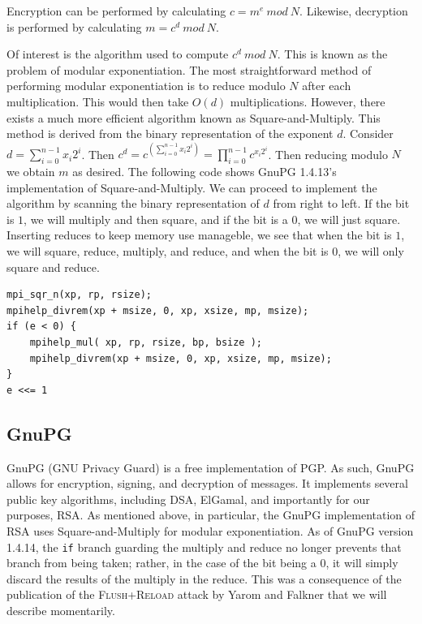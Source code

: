 \documentclass[11pt]{llncs}
\newcommand{\flushreload}{\textsc{Flush}+\textsc{Reload}}
\begin{document}
Encryption can be performed by calculating $c = m^e\ mod\ N$. Likewise,
decryption is performed by calculating $m = c^d\ mod\ N$.

Of interest is the algorithm used to compute $c^d\ mod\ N$. This is known as the
problem of modular exponentiation. The most straightforward method of performing
modular exponentiation is to reduce modulo $N$ after each multiplication. This
would then take $O(d)$ multiplications. However, there exists a much more
efficient algorithm known as Square-and-Multiply\cite{Knuth:1997:ACP:270146}.
This method is derived from the binary representation of the exponent $d$.
Consider $d = \sum_{i=0}^{n-1}x_i 2^i$. Then $c^d = c^{(\sum_{i=0}^{n-1}x_i
2^i)} = \prod_{i=0}^{n-1}c^{x_i 2^i}$. Then reducing modulo $N$ we obtain $m$ as
desired. The following code shows GnuPG 1.4.13's implementation of
Square-and-Multiply. We can proceed to implement the algorithm by scanning the
binary representation of $d$ from right to left. If the bit is $1$, we will
multiply and then square, and if the bit is a $0$, we will just square.
Inserting reduces to keep memory use manageble, we see that when the bit is $1$,
we will square, reduce, multiply, and reduce, and when the bit is $0$, we will
only square and reduce.

\begin{lstlisting}[caption={GnuPG 1.4.13's implementation of Square-and-Multiply
    (excerpted)}]
mpi_sqr_n(xp, rp, rsize);
mpihelp_divrem(xp + msize, 0, xp, xsize, mp, msize);
if (e < 0) {
    mpihelp_mul( xp, rp, rsize, bp, bsize );
    mpihelp_divrem(xp + msize, 0, xp, xsize, mp, msize);
}
e <<= 1
\end{lstlisting}

\subsection{GnuPG}

GnuPG (GNU Privacy Guard) is a free implementation of PGP. As such, GnuPG allows
for encryption, signing, and decryption of messages. It implements several
public key algorithms, including DSA, ElGamal, and importantly for our purposes,
RSA. As mentioned above, in particular, the GnuPG implementation of RSA uses
Square-and-Multiply for modular exponentiation. As of GnuPG version 1.4.14, the
\texttt{if} branch guarding the multiply and reduce no longer prevents that
branch from being taken; rather, in the case of the bit being a $0$, it will
simply discard the results of the multiply in the reduce. This was a consequence
of the publication of the \flushreload{} attack by Yarom and Falkner\cite{YF13}
that we will describe momentarily.
\end{document}

